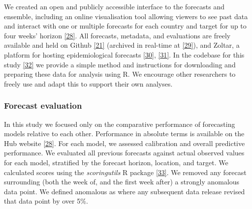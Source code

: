 \documentclass[
]{article}
\begin{document}
We created an open and publicly accessible interface to the forecasts and ensemble, including an online visualisation tool allowing viewers to see past data and interact with one or multiple forecasts for each country and target for up to four weeks' horizon \protect\hyperlink{ref-europeancovid-19forecasthubEuropeanCovid19Forecast}{{[}28{]}}. All forecasts, metadata, and evaluations are freely available and held on Github \protect\hyperlink{ref-europeancovid-19forecasthubEuropeanCOVID19Forecast2021}{{[}21{]}} (archived in real-time at \protect\hyperlink{ref-katharine_sherratt_2022_7356267}{{[}29{]}}), and Zoltar, a platform for hosting epidemiological forecasts \protect\hyperlink{ref-epiforecastsProjectECDCEuropean2021}{{[}30{]}}, \protect\hyperlink{ref-reichZoltarForecastArchive2021}{{[}31{]}}. In the codebase for this study \protect\hyperlink{ref-PredictivePerformanceMultimodel2022}{{[}32{]}} we provide a simple method and instructions for downloading and preparing these data for analysis using R. We encourage other researchers to freely use and adapt this to support their own analyses.

\hypertarget{forecast-evaluation}{%
\subsubsection{Forecast evaluation}\label{forecast-evaluation}}

In this study we focused only on the comparative performance of forecasting models relative to each other. Performance in absolute terms is available on the Hub website \protect\hyperlink{ref-europeancovid-19forecasthubEuropeanCovid19Forecast}{{[}28{]}}. For each model, we assessed calibration and overall predictive performance. We evaluated all previous forecasts against actual observed values for each model, stratified by the forecast horizon, location, and target. We calculated scores using the \emph{scoringutils} R package \protect\hyperlink{ref-nikosibosseScoringutilsUtilitiesScoring2020}{{[}33{]}}. We removed any forecast surrounding (both the week of, and the first week after) a strongly anomalous data point. We defined anomalous as where any subsequent data release revised that data point by over 5\%.
\end{document}
